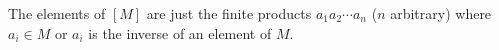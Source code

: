 The elements of $[M]$ are just the finite products $a_1 a_2 \cdots a_n$ ($n$ arbitrary) where $a_i \in M$ or $a_i$ is the inverse of an element of $M$.
